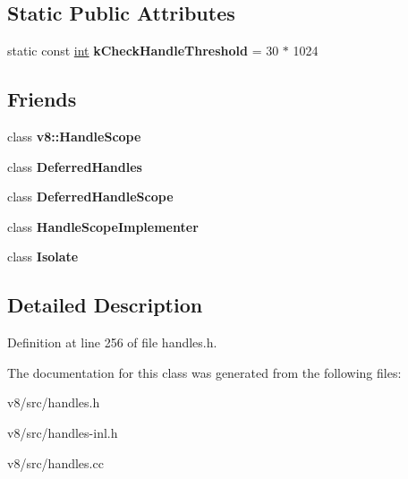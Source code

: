 \subsection*{Static Public Attributes}
\begin{DoxyCompactItemize}
\item 
\mbox{\label{classv8_1_1internal_1_1HandleScope_aba5a5d86706677947f728ef03adddee3}} 
static const \mbox{\hyperlink{classint}{int}} {\bfseries k\+Check\+Handle\+Threshold} = 30 $\ast$ 1024
\end{DoxyCompactItemize}
\subsection*{Friends}
\begin{DoxyCompactItemize}
\item 
\mbox{\label{classv8_1_1internal_1_1HandleScope_a8b16bf00a6bc5a91a76e86067d2f9dfc}} 
class {\bfseries v8\+::\+Handle\+Scope}
\item 
\mbox{\label{classv8_1_1internal_1_1HandleScope_abf66bd266bd1fddbc859832c4838b436}} 
class {\bfseries Deferred\+Handles}
\item 
\mbox{\label{classv8_1_1internal_1_1HandleScope_ab79a97e63b62ac3e95a40640e3e70f96}} 
class {\bfseries Deferred\+Handle\+Scope}
\item 
\mbox{\label{classv8_1_1internal_1_1HandleScope_a4212b6d1addb496cb92d67a2e399a1f3}} 
class {\bfseries Handle\+Scope\+Implementer}
\item 
\mbox{\label{classv8_1_1internal_1_1HandleScope_aba4f0964bdacf2bbf62cf876e5d28d0a}} 
class {\bfseries Isolate}
\end{DoxyCompactItemize}


\subsection{Detailed Description}


Definition at line 256 of file handles.\+h.



The documentation for this class was generated from the following files\+:\begin{DoxyCompactItemize}
\item 
v8/src/handles.\+h\item 
v8/src/handles-\/inl.\+h\item 
v8/src/handles.\+cc\end{DoxyCompactItemize}
